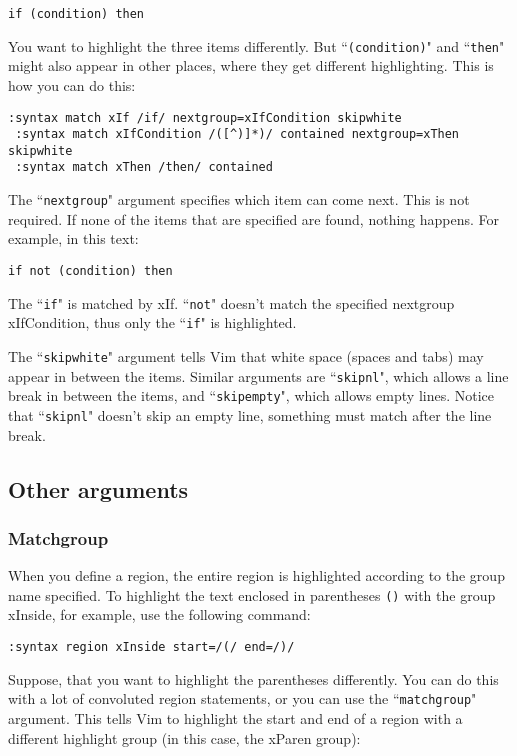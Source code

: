 \begin{Verbatim}[samepage=true]
    if (condition) then
\end{Verbatim}

You want to highlight the three items differently.
But ``\texttt{(condition)}" and ``\texttt{then}" might also appear in other places, where they get different highlighting.
This is how you can do this:

\begin{Verbatim}[samepage=true]
 :syntax match xIf /if/ nextgroup=xIfCondition skipwhite
 :syntax match xIfCondition /([^)]*)/ contained nextgroup=xThen skipwhite
 :syntax match xThen /then/ contained
\end{Verbatim}

The ``\texttt{nextgroup}" argument specifies which item can come next.
This is not required.
If none of the items that are specified are found, nothing happens.
For example, in this text:

\begin{Verbatim}[samepage=true]
    if not (condition) then
\end{Verbatim}

The ``\texttt{if}" is matched by xIf.
``\texttt{not}" doesn't match the specified nextgroup xIfCondition, thus only the ``\texttt{if}" is highlighted.

The ``\texttt{skipwhite}" argument tells Vim that white space (spaces and tabs) may appear in between the items.
Similar arguments are ``\texttt{skipnl}", which allows a line break in between the items, and ``\texttt{skipempty}", which allows empty lines.
Notice that ``\texttt{skipnl}" doesn't skip an empty line, something must match after the line break.
\subsection{Other arguments}
\subsubsection{Matchgroup}
When you define a region, the entire region is highlighted according to the group name specified.
To highlight the text enclosed in parentheses \texttt{()} with the group xInside, for example, use the following command:

\begin{Verbatim}[samepage=true]
 :syntax region xInside start=/(/ end=/)/
\end{Verbatim}

Suppose, that you want to highlight the parentheses differently.
You can do this with a lot of convoluted region statements, or you can use the ``\texttt{matchgroup}" argument.
This tells Vim to highlight the start and end of a region with a different highlight group (in this case, the xParen group):

